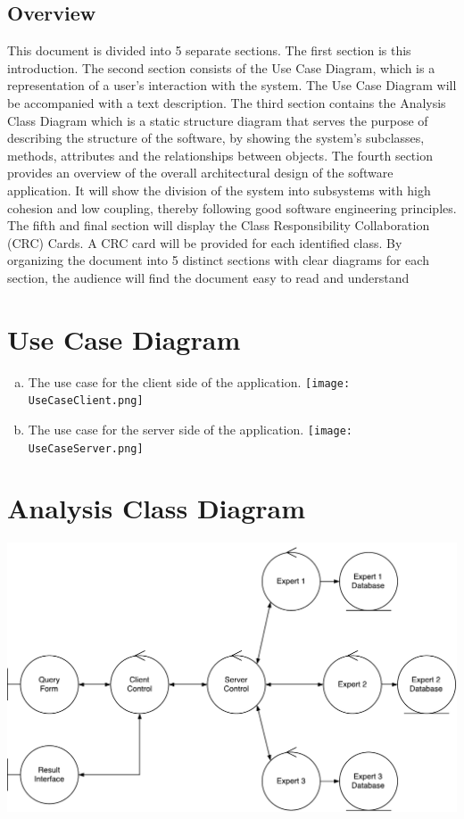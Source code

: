 \documentclass[]{article}
\begin{document}
\subsection{Overview}
\label{sub:overview}
This document is divided into 5 separate sections. The first section is this introduction. The second section consists of the Use Case Diagram, which is a representation of a user’s interaction with the system. The Use Case Diagram will be accompanied with a text description. The third section contains the Analysis Class Diagram which is a static structure diagram that serves the purpose of describing the structure of the software, by showing the system’s subclasses, methods, attributes and the relationships between objects. The fourth section provides an overview of the overall architectural design of the software application. It will show the division of the system into subsystems with high cohesion and low coupling, thereby following good software engineering principles. 
The fifth and final section will display the Class Responsibility Collaboration (CRC) Cards. A CRC card will be provided for each identified class. By organizing the document into 5 distinct sections with clear diagrams for each section, the audience will find the document easy to read and understand


\section{Use Case Diagram}
\label{sec:use_case_diagram}
\begin{enumerate}[a)]
	\item The use case for the client side of the application.\newline
	\texttt{[image: UseCaseClient.png]}
	\newpage
	\item The use case for the server side of the application.\newline
	\texttt{[image: UseCaseServer.png]}
\end{enumerate}

\section{Analysis Class Diagram}
\label{sec:analysis_class_diagram}
\includegraphics[width=\textwidth]{ACDRevised.pdf}
\end{document}

